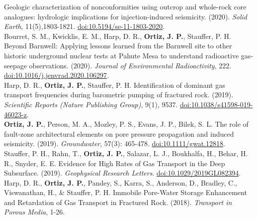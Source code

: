\documentclass[11pt, letterpaper]{article}
\newcommand{\years}[1]{\marginnote{\scriptsize #1}}
\begin{document}
Geologic characterization of nonconformities using outcrop and whole-rock core
analogues: hydrologic implications for injection-induced seismicity. (2020).
\emph{Solid Earth}, 11(5),1803-1821. 
\href{https://se.copernicus.org/articles/11/1803/2020/se-11-1803-2020.pdf}{doi:10.5194/se-11-1803-2020}.
\SolidEarthOOOOGeologiccharacteriza\\
%
\years{2020}Bourret, S. M., Kwicklis, E. M., Harp, D. R., \textbf{Ortiz, J.
P.}, Stauffer, P. H. Beyond Barnwell: Applying lessons learned from the
Barnwell site to other historic underground nuclear tests at Pahute Mesa to
understand radioactive gas-seepage observations. (2020). \emph{Journal of Environmental
Radioactivity}, 222. 
\href{https://www.sciencedirect.com/science/article/pii/S0265931X20300199/pdfft?md5=63166f84895846446b3a9ce93cc68c79&pid=1-s2.0-S0265931X20300199-main.pdf}{doi:10.1016/j.jenvrad.2020.106297}.
\JournalofEnvironmentOOOOBeyondBarnwellApplyi\\
%
\years{2019}Harp, D. R., \textbf{Ortiz, J. P.}, Stauffer, P. H. Identification
of dominant gas transport frequencies during barometric pumping of fractured
rock. (2019). \emph{Scientific Reports (Nature Publishing Group)}, 9(1), 9537.
\href{https://www.nature.com/articles/s41598-019-46023-z.pdf}{doi:10.1038/s41598-019-46023-z}.
\ScientificReportsOOOOIdentificationofdomi\\ 
%
\years{2019}\textbf{Ortiz, J. P.}, Person,
M. A., Mozley, P. S., Evans, J. P., Bilek, S. L. The role of fault-zone
architectural elements on pore pressure propagation and induced seismicity.
(2019). \emph{Groundwater}, 57(3): 465-478. 
\href{https://ngwa.onlinelibrary.wiley.com/doi/epdf/10.1111/gwat.12818}{doi:10.1111/gwat.12818}.
\GroundwaterOOOOTheRoleofFaultZoneAr\\
%
\years{2019}Stauffer, P. H., Rahn, T., \textbf{Ortiz, J. P.}, Salazar, L. J.,
Boukhalfa, H., Behar, H. R., Snyder, E. E. Evidence for High Rates of Gas
Transport in the Deep Subsurface. (2019). \emph{Geophysical Research Letters}.
\href{https://agupubs.onlinelibrary.wiley.com/doi/epdf/10.1029/2019GL082394}{doi:10.1029/2019GL082394}.
\GeophysicalResearchLOOOOEvidenceforHighRates\\ 
%
\years{2018}Harp, D. R., \textbf{Ortiz, J. P.},
Pandey, S., Karra, S., Anderson, D., Bradley, C., Viswanathan, H., \& Stauffer,
P. H. Immobile Pore-Water Storage Enhancement and Retardation of Gas Transport
in Fractured Rock. (2018). \emph{Transport in Porous Media}, 1-26.
\end{document}
